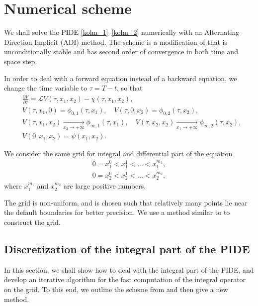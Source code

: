 
\section{Numerical scheme}

We shall solve the PIDE \eqref{kolm_1}--\eqref{kolm_2} numerically with an Alternating Direction Implicit (ADI) method. The scheme is a modification of \cite{LiptonSepp} that is unconditionally stable and has second order of convergence in both time and space step.

In order to deal with a forward equation instead of a backward equation, we change the time variable to $\tau = T - t$, so that
\begin{equation}
	\label{pide_forward}
	\begin{aligned}
		& \frac{\partial V}{\partial \tau} = \mathcal{L} V(\tau, x_1, x_2) - \chi(\tau, x_1, x_2), \\
		& V(\tau, x_1, 0) = \phi_{0, 1}(\tau, x_1), \quad V(\tau, 0, x_2) =  \phi_{0, 2}(\tau, x_2), \\
		& V(\tau, x_1, x_2)  \underset{x_2 \to +\infty}{\longrightarrow} \phi_{\infty, 1}(\tau, x_1), \quad V(\tau, x_2, x_2)  \underset{x_1 \to +\infty}{\longrightarrow}  \phi_{\infty, 2}(\tau, x_2), \\
		& V(0, x_1, x_2) = \psi(x_1, x_2).
	\end{aligned}
\end{equation}

We consider the same grid for integral and differential part of the equation
\begin{equation}
	\begin{aligned}
		0 = x_1^0 < x_1^1 < \ldots < x_1^{m_1}, \\
		0 = x_2^0 < x_2^1 < \ldots < x_2^{m_2},
	\end{aligned}
\end{equation}
where $x_1^{m_1}$ and $x_2^{m_2}$ are large positive numbers.

The grid is non-uniform, and is chosen such that relatively many points lie near the default boundaries for better precision. We use a method similar to \cite{itkin2011jumps} to construct the grid.
\subsection{Discretization of the integral part of the PIDE}
In this section, we shall show how to deal with the integral part of the PIDE, and develop an iterative algorithm for the fast computation of the integral operator on the grid. To this end, we outline the scheme from \cite{LiptonSepp} and then give a new method.

